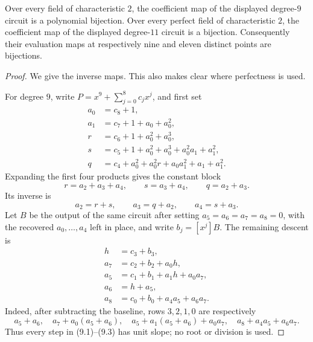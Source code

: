 \begin{lemma}
\label{lem:char2-small-staircase-butterfly}
Over every field of characteristic $2$, the coefficient map of the displayed
degree-$9$ circuit is a polynomial bijection.  Over every perfect field of
characteristic $2$, the coefficient map of the displayed degree-$11$ circuit is
a bijection.  Consequently their evaluation maps at respectively nine and
eleven distinct points are bijections.
\end{lemma}
\begin{proof}
We give the inverse maps.  This also makes clear where perfectness is used.

For degree $9$, write
\(P=x^9+\sum_{j=0}^8c_jx^j\), and first set
\[
\begin{aligned}
 a_0&=c_8+1,\\
 a_1&=c_7+1+a_0+a_0^2,\\
 r&=c_6+1+a_0^2+a_0^3,\\
 s&=c_5+1+a_0^2+a_0^3+a_0^2a_1+a_1^2,\\
 q&=c_4+a_0^2+a_0^2r+a_0a_1^2+a_1+a_1^2.
\end{aligned}                                                    \tag{9.1}
\]
Expanding the first four products gives the constant block
\[
 r=a_2+a_3+a_4,\qquad s=a_3+a_4,\qquad q=a_2+a_3.
\]
Its inverse is
\[
 a_2=r+s,\qquad a_3=q+a_2,\qquad a_4=s+a_3.             \tag{9.2}
\]
Let $B$ be the output of the same circuit after setting
$a_5=a_6=a_7=a_8=0$, with the recovered $a_0,\ldots,a_4$ left in place,
and write $b_j=[x^j]B$.  The remaining descent is
\[
\begin{aligned}
 h&=c_3+b_3,\\
 a_7&=c_2+b_2+a_0h,\\
 a_5&=c_1+b_1+a_1h+a_0a_7,\\
 a_6&=h+a_5,\\
 a_8&=c_0+b_0+a_4a_5+a_6a_7.
\end{aligned}                                                    \tag{9.3}
\]
Indeed, after subtracting the baseline, rows $3,2,1,0$ are respectively
\[
 a_5+a_6,\quad
 a_7+a_0(a_5+a_6),\quad
 a_5+a_1(a_5+a_6)+a_0a_7,\quad
 a_8+a_4a_5+a_6a_7.
\]
Thus every step in (9.1)--(9.3) has unit slope; no root or division is used.


\end{proof}
